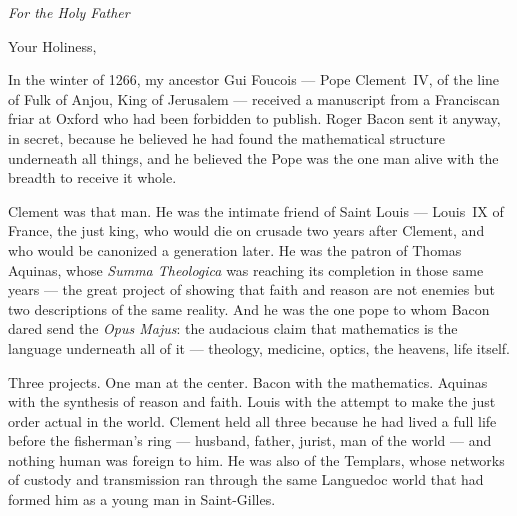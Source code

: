 \documentclass[12pt, oneside]{book}
\theoremstyle{plain}
\theoremstyle{definition}
\theoremstyle{remark}
\begin{document}
\cleardoublepage

\tableofcontents
\cleardoublepage

\mainmatter

\newpage
\thispagestyle{empty}
\vspace*{2.2cm}
\begin{center}
{\large\textit{For the Holy Father}}
\end{center}
\vspace{1.4cm}
\noindent Your Holiness,
\vspace{0.5cm}

\noindent In the winter of 1266, my ancestor Gui Foucois ---
Pope Clement~IV, of the line of Fulk of Anjou,
King of Jerusalem --- received a manuscript from
a Franciscan friar at Oxford who had been forbidden
to publish. Roger Bacon sent it anyway, in secret,
because he believed he had found the mathematical
structure underneath all things, and he believed
the Pope was the one man alive with the breadth
to receive it whole.

\vspace{0.4cm}
\noindent Clement was that man. He was the intimate friend
of Saint Louis --- Louis~IX of France, the just king,
who would die on crusade two years after Clement,
and who would be canonized a generation later.
He was the patron of Thomas Aquinas, whose
\textit{Summa Theologica} was reaching its completion
in those same years --- the great project of showing
that faith and reason are not enemies but two descriptions
of the same reality. And he was the one pope to whom
Bacon dared send the \textit{Opus Majus}: the audacious
claim that mathematics is the language underneath all of
it --- theology, medicine, optics, the heavens, life itself.

\vspace{0.4cm}
\noindent Three projects. One man at the center.
Bacon with the mathematics. Aquinas with the synthesis
of reason and faith. Louis with the attempt to make
the just order actual in the world. Clement held all
three because he had lived a full life before the
fisherman's ring --- husband, father, jurist, man of
the world --- and nothing human was foreign to him.
He was also of the Templars, whose networks of custody
and transmission ran through the same Languedoc world
that had formed him as a young man in Saint-Gilles.
\end{document}
